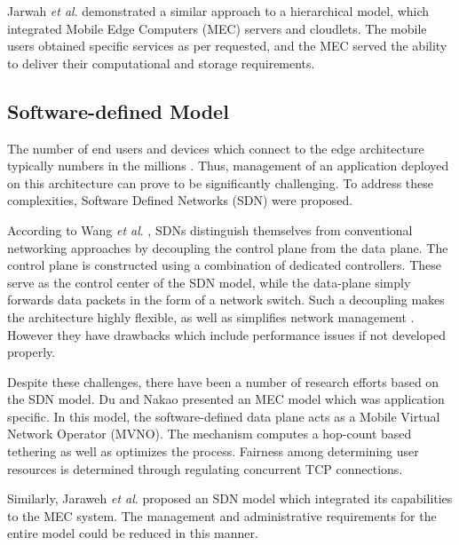 Jarwah \textit{et al}. \cite{jararweh2016future} demonstrated a similar approach to a hierarchical model, which integrated Mobile Edge Computers (MEC) servers and cloudlets. The mobile users obtained specific services as per requested, and the MEC served the ability to deliver their computational and storage requirements.\par

\subsection{Software-defined Model}
\label{subsec:ch3-software-defined-model}

The number of end users and devices which connect to the edge architecture typically numbers in the millions \cite{yu2017survey}. Thus, management of an application deployed on this architecture can prove to be significantly challenging. To address these complexities, Software Defined Networks (SDN) were proposed.\par

According to Wang \textit{et al}. \cite{wang2017controller}, SDNs distinguish themselves from conventional networking approaches by decoupling the control plane from the data plane. The control plane is constructed using a combination of dedicated controllers. These serve as the control center of the SDN model, while the data-plane simply forwards data packets in the form of a network switch. Such a decoupling makes the architecture highly flexible, as well as simplifies network management \cite{liu2015device}. However they have drawbacks which include performance issues if not developed properly.\par

Despite these challenges, there have been a number of research efforts based on the SDN model. Du and Nakao \cite{du2016application} presented an MEC model which was application specific. In this model, the software-defined data plane acts as a Mobile Virtual Network Operator (MVNO). The mechanism computes a hop-count based tethering as well as optimizes the process.  Fairness among determining user resources is determined through regulating concurrent TCP connections.\par

Similarly, Jaraweh \textit{et al}. \cite{jararweh2016sdmec} proposed an SDN model which integrated its capabilities to the MEC system. The management and administrative requirements for the entire model could be reduced in this manner.\par

